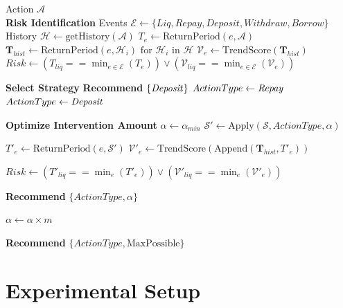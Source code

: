 \documentclass[manuscript,screen,review]{acmart}
\begin{document}
\begin{algorithm}[tbh]
\caption{Counterfactual Risk Optimization}
\label{alg:recommendation}
\begin{algorithmic}[1]
\REQUIRE Action $\mathcal{A}$
\\ \textbf{Risk Identification}
\STATE Events $\mathcal{E} \leftarrow \{Liq, Repay, Deposit, Withdraw, Borrow\}$
\STATE History $\mathcal{H} \leftarrow \text{getHistory}(\mathcal{A})$
    \STATE $T_e \leftarrow \text{ReturnPeriod}(e, \mathcal{A})$
    \STATE $\mathbf{T}_{hist} \leftarrow \text{ReturnPeriod}(e, \mathcal{H}_i) \text{ for }\mathcal{H}_i\text{ in }\mathcal{H}$
    \STATE $\mathcal{V}_e \leftarrow \text{TrendScore}(\mathbf{T}_{hist})$
\ENDFOR
\STATE $Risk \leftarrow (T_{liq} == \min_{e \in \mathcal{E}}(T_e)) \lor (\mathcal{V}_{liq} == \min_{e \in \mathcal{E}}(\mathcal{V}_e))$

\textbf{Select Strategy}
    \RETURN \textbf{Recommend} $\{\text{\textit{Deposit}}\}$
\ELSE
        \STATE $ActionType \leftarrow \text{\textit{Repay}}$
    \ELSE
        \STATE $ActionType \leftarrow \text{\textit{Deposit}}$
    \ENDIF
\ENDIF

\textbf{Optimize Intervention Amount}
\STATE $\alpha \leftarrow \alpha_{min}$ 
    \STATE $\mathcal{S}' \leftarrow \text{Apply}(\mathcal{S}, ActionType, \alpha)$
    
        \STATE $T'_e \leftarrow \text{ReturnPeriod}(e, \mathcal{S}')$
        \STATE $\mathcal{V}'_e \leftarrow \text{TrendScore}(\text{Append}(\mathbf{T}_{hist}, T'_e))$
    \ENDFOR
    
    \STATE $Risk \leftarrow (T'_{liq} == \min_{e}(T'_e)) \lor (\mathcal{V}'_{liq} == \min_{e}(\mathcal{V}'_e))$
    
        \RETURN \textbf{Recommend} $\{ActionType, \alpha\}$
    \ENDIF
    
    \STATE $\alpha \leftarrow \alpha \times m$ %
\ENDWHILE

\RETURN \textbf{Recommend} $\{ActionType, \text{MaxPossible}\}$
\end{algorithmic}
\end{algorithm}


\section{Experimental Setup}
\label{sec:experimental_setup}
\end{document}
